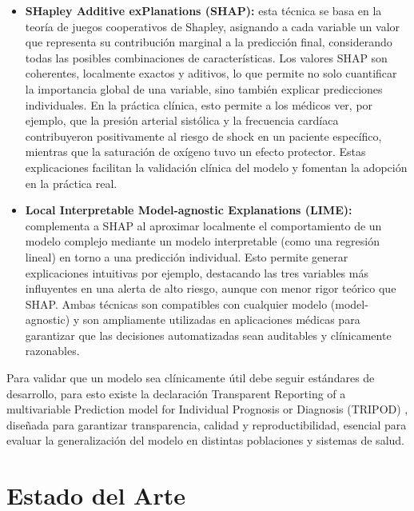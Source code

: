 \documentclass[12pt, letterpaper]{article}
\begin{document}
\begin{itemize}
    \item \textbf{SHapley Additive exPlanations (SHAP):} esta técnica se basa en la teoría de juegos cooperativos de Shapley, asignando a cada variable un valor que representa su contribución marginal a la predicción final, considerando todas las posibles combinaciones de características. Los valores SHAP son coherentes, localmente exactos y aditivos, lo que permite no solo cuantificar la importancia global de una variable, sino también explicar predicciones individuales. En la práctica clínica, esto permite a los médicos ver, por ejemplo, que la presión arterial sistólica y la frecuencia cardíaca contribuyeron positivamente al riesgo de shock en un paciente específico, mientras que la saturación de oxígeno tuvo un efecto protector. Estas explicaciones facilitan la validación clínica del modelo y fomentan la adopción en la práctica real.

    \item \textbf{Local Interpretable Model-agnostic Explanations (LIME):} complementa a SHAP al aproximar localmente el comportamiento de un modelo complejo mediante un modelo interpretable (como una regresión lineal) en torno a una predicción individual. Esto permite generar explicaciones intuitivas por ejemplo, destacando las tres variables más influyentes en una alerta de alto riesgo, aunque con menor rigor teórico que SHAP. Ambas técnicas son compatibles con cualquier modelo (model-agnostic) y son ampliamente utilizadas en aplicaciones médicas para garantizar que las decisiones automatizadas sean auditables y clínicamente razonables.
\end{itemize}

Para validar que un modelo sea clínicamente útil debe seguir estándares de desarrollo, para esto existe la declaración Transparent Reporting of a multivariable Prediction model for Individual Prognosis or Diagnosis (TRIPOD) \cite{collins2015}, diseñada para garantizar transparencia, calidad y reproductibilidad, esencial para evaluar la generalización del modelo en distintas poblaciones y sistemas de salud.

\newpage

\section{Estado del Arte}
\end{document}
